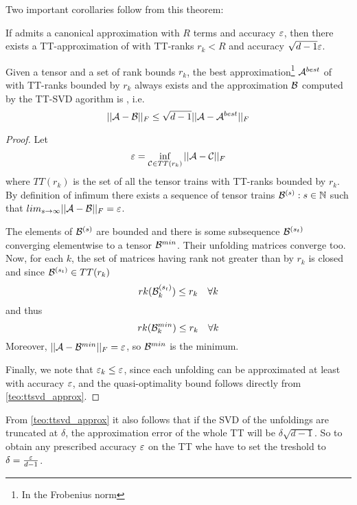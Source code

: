 Two important corollaries follow from this theorem:
\begin{Cor}
  If \A admits a canonical approximation with $R$ terms %
  and accuracy $\varepsilon$, then there exists a TT-approximation of \A with TT-ranks $r_k < R$ and accuracy $\sqrt{d-1} \varepsilon$.
\end{Cor}
\begin{Cor}
  Given a tensor \A and a set of rank bounds $r_k$, the best approximation\footnote{In the Frobenius norm} $\mathcal{A}^{best}$ of \A with TT-ranks bounded by $r_k$ always exists and the approximation $\mathcal{B}$ computed by the TT-SVD agorithm is , i.e.
  \begin{equation*}
    ||\mathcal{A} - \mathcal{B}||_F \le \sqrt{d-1} ||\mathcal{A} - \mathcal{A}^{best}||_F
  \end{equation*}

  \begin{proof}
    Let
    \begin{equation*}
     \varepsilon = \inf_{\mathcal{C} \in TT(r_k)} ||\mathcal{A} - \mathcal{C}||_F
    \end{equation*}
    where $TT(r_k)$ is the set of all the tensor trains with TT-ranks bounded by $r_k$. By definition of infimum there exists a sequence of tensor trains $\mathcal{B}^{(s)} : s \in \mathbb{N}$ such that $lim_{s\to\infty} ||\mathcal{A} - \mathcal{B}||_F = \varepsilon$.

    The elements of $\mathcal{B}^{(s)}$ are bounded and %
    there is some subsequence $\mathcal{B}^{(s_t)}$ converging elementwise to a tensor $\mathcal{B}^{min}$. Their unfolding matrices converge too. Now, for each $k$, the set of matrices having rank not greater than by $r_k$ is closed and since $\mathcal{B}^{(s_t)} \in TT(r_k)$
    \begin{equation*}
      rk(\mathcal{B}^{(s_t)}_k) \le r_k \quad \forall k
    \end{equation*}
    and thus
    \begin{equation*}
      rk(\mathcal{B}^{min}_k) \le r_k \quad \forall k
    \end{equation*}
    Moreover, $||\mathcal{A} - \mathcal{B}^{min}||_F = \varepsilon$,  so $\mathcal{B}^{min}$ is the minimum.

    Finally, we note that $\varepsilon_k \le \varepsilon$, since each unfolding can be approximated at least with accuracy $\varepsilon$, and the quasi-optimality bound follows directly from \ref{teo:ttsvd_approx}.
  \end{proof}
\end{Cor}

\begin{Cor}
  From \ref{teo:ttsvd_approx} it also follows that if the SVD of the unfoldings are truncated at $\delta$, the approximation error of the whole TT will be $\delta \sqrt{d-1}$. So to obtain any prescribed accuracy $\varepsilon$ on the TT whe have to set the treshold to $\delta = \frac{\varepsilon}{d-1}$.
\end{Cor}

